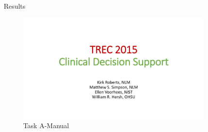 \documentclass[final]{beamer}
\newlength{\sepwid}
\newlength{\onecolwid}
\newlength{\twocolwid}
\begin{document}
\begin{frame}[t]
\begin{columns}[t]
\begin{column}{\twocolwid}
\begin{columns}[t,totalwidth=\twocolwid] %

\begin{column}{\onecolwid} %





\end{column} %

\begin{column}{\onecolwid} %



\end{column} %

\end{columns} %

\end{column} %

\begin{column}{\sepwid}\end{column} %

\begin{column}{\onecolwid} %


\begin{block}{Results}
  \begin{figure}
    \centering
    \includegraphics[page=12,trim={7cm 0 7cm 7cm},clip]{images/2015-CDS-Results.pdf}
    \caption{Task A-Manual}
  \end{figure}


\end{block}
\end{column}
\end{columns}
\end{frame}
\end{document}
